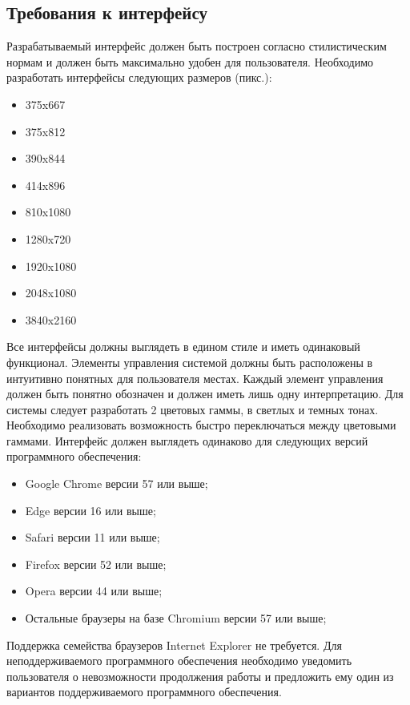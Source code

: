 \documentclass[14pt]{extreport}
\begin{document}
        \subsection{Требования к интерфейсу}
            Разрабатываемый интерфейс должен быть построен согласно стилистическим нормам и должен быть максимально удобен для пользователя. Необходимо разработать интерфейсы следующих размеров (пикс.):
            \begin{itemize}
                \item 375x667
                \item 375x812 
                \item 390x844
                \item 414x896
                \item 810x1080
                \item 1280x720
                \item 1920x1080
                \item 2048x1080
                \item 3840x2160
            \end{itemize}

            Все интерфейсы должны выглядеть в едином стиле и иметь одинаковый функционал. Элементы управления системой должны быть расположены в интуитивно понятных для пользователя местах. Каждый элемент управления должен быть понятно обозначен и должен иметь лишь одну интерпретацию. Для системы следует разработать 2 цветовых гаммы, в светлых и темных тонах. Необходимо реализовать возможность быстро переключаться между цветовыми гаммами. Интерфейс должен выглядеть одинаково для следующих версий программного обеспечения:

            \begin{itemize}
                \item Google Chrome версии 57 или выше;
                \item Edge версии 16 или выше;
                \item Safari версии 11 или выше;
                \item Firefox версии 52 или выше; 
                \item Opera версии 44 или выше;
                \item Остальные браузеры на базе Chromium версии 57 или выше;
            \end{itemize}

            Поддержка семейства браузеров Internet Explorer не требуется. Для неподдерживаемого программного обеспечения необходимо уведомить пользователя о невозможности продолжения работы и предложить ему один из вариантов поддерживаемого программного обеспечения. 
\end{document}
